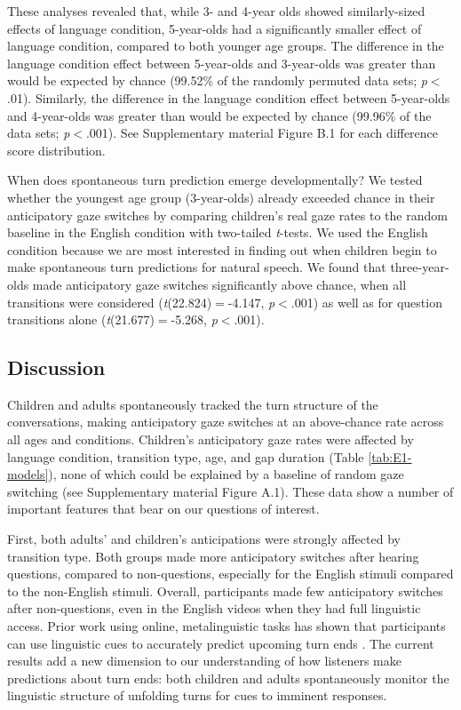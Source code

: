 \documentclass[authoryear, 12pt]{elsarticle}
\begin{document}
These analyses revealed that, while 3- and 4-year olds showed similarly-sized effects of language condition, 5-year-olds had a significantly smaller effect of language condition, compared to both younger age groups. The difference in the language condition effect between 5-year-olds and 3-year-olds was greater than would be expected by chance (99.52\% of the randomly permuted data sets; \textit{p}$<$.01). Similarly, the difference in the language condition effect between 5-year-olds and 4-year-olds was greater than would be expected by chance (99.96\% of the data sets; \textit{p}$<$.001). See Supplementary material Figure B.1 for each difference score distribution.

When does spontaneous turn prediction emerge developmentally? We tested whether the youngest age group (3-year-olds) already exceeded chance in their anticipatory gaze switches by comparing children's real gaze rates to the random baseline in the English condition with two-tailed \textit{t}-tests. We used the English condition because we are most interested in finding out when children begin to make spontaneous turn predictions for natural speech. We found that three-year-olds made anticipatory gaze switches significantly above chance, when all transitions were considered (\textit{t}(22.824)$=$-4.147, \textit{p}$<$.001) as well as for question transitions alone (\textit{t}(21.677)$=$-5.268, \textit{p}$<$.001).

\subsection*{Discussion}
\label{sec:discussion1}

Children and adults spontaneously tracked the turn structure of the conversations, making anticipatory gaze switches at an above-chance rate across all ages and conditions. Children's anticipatory gaze rates were affected by language condition, transition type, age, and gap duration (Table \ref{tab:E1-models}), none of which could be explained by a baseline of random gaze switching (see Supplementary material Figure A.1). These data show a number of important features that bear on our questions of interest.

First, both adults' and children's anticipations were strongly affected by transition type. Both groups made more anticipatory switches after hearing questions, compared to non-questions, especially for the English stimuli compared to the non-English stimuli. Overall, participants made few anticipatory switches after non-questions, even in the English videos when they had full linguistic access. Prior work using online, metalinguistic tasks has shown that participants can use linguistic cues to accurately predict upcoming turn ends \citep{bogelstorreira2015, magyari2012, de-ruiter2006}. The current results add a new dimension to our understanding of how listeners make predictions about turn ends: both children and adults spontaneously monitor the linguistic structure of unfolding turns for cues to imminent responses.
\end{document}
